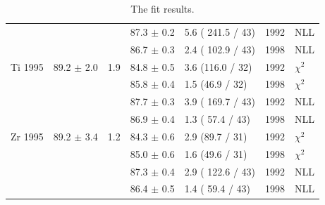 \begin{table}[H]
\begin{center}
\begin{tabular}{|l||l|l|l|l|l|l|}
                &                &     & 87.3 $\pm$ 0.2 & 5.6 ( 241.5 / 43) & 1992 & NLL \\
                &                &     & 86.7 $\pm$ 0.3 & 2.4 ( 102.9 / 43)& 1998 & NLL \\
      \hline                                                                
       Ti 1995   & 89.2 $\pm$ 2.0 & 1.9 &84.8 $\pm$ 0.5 &  3.6 (116.0 / 32) & 1992 & $\chi^2$ \\  
                 &                &     &85.8 $\pm$ 0.4 &  1.5 (46.9 / 32)  & 1998 & $\chi^2$ \\  
                                                                            
                &                &     & 87.7 $\pm$ 0.3 & 3.9 ( 169.7 / 43) & 1992 & NLL \\
                &                &     & 86.9 $\pm$ 0.4 & 1.3 ( 57.4 / 43) & 1998 & NLL \\
      \hline                                                                
       Zr 1995   & 89.2 $\pm$ 3.4 & 1.2 &84.3 $\pm$ 0.6 &  2.9 (89.7 / 31)  & 1992 & $\chi^2$ \\  
                 &                &     &85.0 $\pm$ 0.6 &  1.6 (49.6 / 31)  & 1998 & $\chi^2$ \\  
                                                                            
                &                &     & 87.3 $\pm$ 0.4 & 2.9 ( 122.6 / 43) & 1992 & NLL \\
                &                &     & 86.4 $\pm$ 0.5 & 1.4 ( 59.4 / 43) & 1998 & NLL \\
      \hline
                                                                                
    \end{tabular}
  \end{center}
  \caption{The fit results.}
  \label{table:fits1995}
\end{table}


